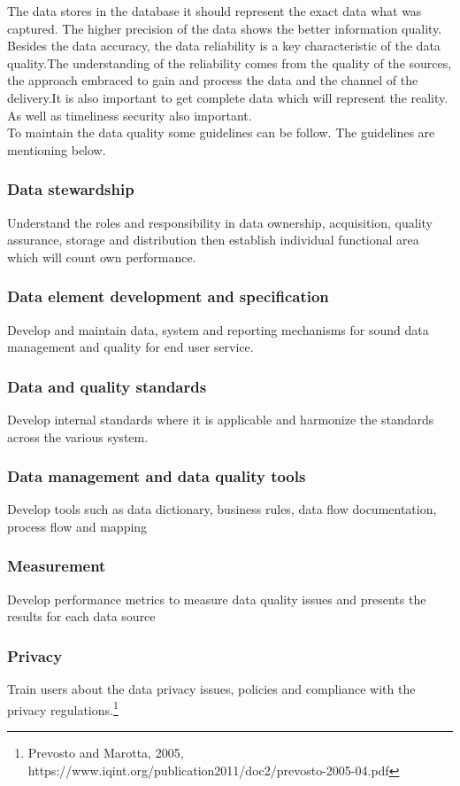 The data stores in the database it should represent the exact data what was captured. The higher precision of the data shows the better information quality. Besides the data accuracy, the data reliability is a key characteristic of the data quality.The  understanding of the reliability comes from the quality of the sources, the approach embraced to gain and process the data and the channel of the delivery.It is also important to get complete data which will represent the reality. As well as timeliness security also important. \\

To maintain the data quality some guidelines can be follow. The guidelines are mentioning below.

\subsubsection{Data stewardship}
Understand the roles and responsibility in data ownership, acquisition, quality assurance, storage and distribution then establish individual functional area which will count own performance. 
\subsubsection{Data element development and specification}
Develop and maintain data, system and reporting mechanisms for sound data management and quality for end user service. 
\subsubsection{Data and quality standards}
Develop internal standards where it is applicable and harmonize the standards across the various system.
\subsubsection{Data management and data quality tools}
Develop tools such as data dictionary, business rules, data flow documentation, process flow and mapping
\subsubsection{Measurement}
Develop performance metrics to measure data quality issues and presents the results for each data source
\subsubsection{Privacy}
Train users about the data privacy issues, policies and compliance with the privacy regulations.\footnote{Prevosto and Marotta, 2005, https://www.iqint.org/publication2011/doc2/prevosto-2005-04.pdf }













